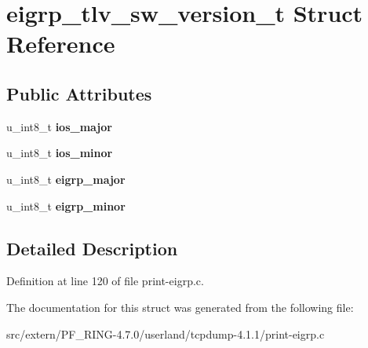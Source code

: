 \hypertarget{structeigrp__tlv__sw__version__t}{
\section{eigrp\_\-tlv\_\-sw\_\-version\_\-t Struct Reference}
\label{structeigrp__tlv__sw__version__t}
}
\subsection*{Public Attributes}
\begin{DoxyCompactItemize}
\item 
\hypertarget{structeigrp__tlv__sw__version__t_a265b64e4daefa0203351afdaedd6addd}{
u\_\-int8\_\-t {\bfseries ios\_\-major}}
\label{structeigrp__tlv__sw__version__t_a265b64e4daefa0203351afdaedd6addd}

\item 
\hypertarget{structeigrp__tlv__sw__version__t_a258f7398387973919c28004da4d8b474}{
u\_\-int8\_\-t {\bfseries ios\_\-minor}}
\label{structeigrp__tlv__sw__version__t_a258f7398387973919c28004da4d8b474}

\item 
\hypertarget{structeigrp__tlv__sw__version__t_a02c5566cb048e19b89ee3231ee50d452}{
u\_\-int8\_\-t {\bfseries eigrp\_\-major}}
\label{structeigrp__tlv__sw__version__t_a02c5566cb048e19b89ee3231ee50d452}

\item 
\hypertarget{structeigrp__tlv__sw__version__t_a0e0206148c21a6bebb9dbe9499ebc9f1}{
u\_\-int8\_\-t {\bfseries eigrp\_\-minor}}
\label{structeigrp__tlv__sw__version__t_a0e0206148c21a6bebb9dbe9499ebc9f1}

\end{DoxyCompactItemize}


\subsection{Detailed Description}


Definition at line 120 of file print-\/eigrp.c.



The documentation for this struct was generated from the following file:\begin{DoxyCompactItemize}
\item 
src/extern/PF\_\-RING-\/4.7.0/userland/tcpdump-\/4.1.1/print-\/eigrp.c\end{DoxyCompactItemize}
